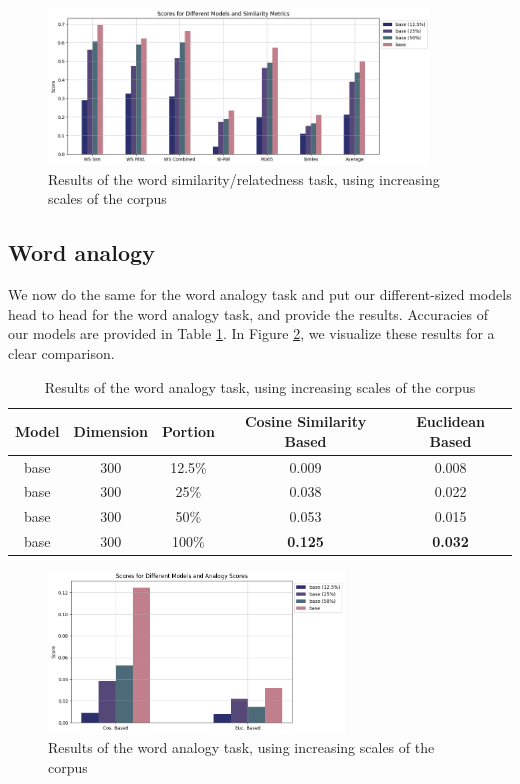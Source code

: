 \begin{figure}[h]
    \centering
    \includegraphics[width=0.9\textwidth]{img/sim-scale.png}
    \caption{Results of the word similarity/relatedness task, using increasing scales of the corpus}
    \label{fig:sim-scale}
\end{figure}


\subsection{Word analogy}

We now do the same for the word analogy task and put our different-sized models head to head for the word analogy task, and provide the results. Accuracies of our models are provided in Table \ref{tab:analogy_scale}. In Figure \ref{fig:analogy_scale}, we visualize these results for a clear comparison.

\begin{table}[h]
\centering
\begin{tabular}{|ccc|cc|}
\hline
Model & Dimension & Portion & Cosine Similarity Based & Euclidean Based \\ \hline
base & 300 & 12.5\% & 0.009 & 0.008 \\
base & 300 & 25\% & 0.038 & 0.022 \\
base & 300 & 50\% & 0.053 & 0.015 \\
base & 300 & 100\% & \textbf{0.125} & \textbf{0.032} \\ \hline
\end{tabular}
\caption{Results of the word analogy task, using increasing scales of the corpus}
\label{tab:analogy_scale}
\end{table}


\begin{figure}[h]
    \centering
    \includegraphics[width=0.7\textwidth]{img/analogy_scale.png}
    \caption{Results of the word analogy task, using increasing scales of the corpus}
    \label{fig:analogy_scale}
\end{figure}

